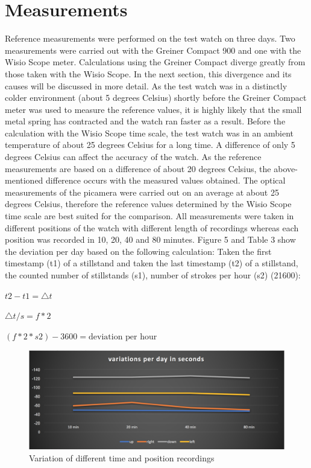 \documentclass[12pt, a4paper]{report}
\begin{document}
    \section{Measurements}
    Reference measurements were performed on the test watch on three days. Two measurements were carried out with the Greiner Compact 900 and one with the Wisio Scope meter. Calculations using the Greiner Compact diverge greatly from those taken with the Wisio Scope. In the next section, this divergence and its causes will be discussed in more detail. 
\bigskip
\newline
As the test watch was in a distinctly colder environment (about 5 degrees Celsius) shortly before the Greiner Compact meter was used to measure the reference values, it is highly likely that the small metal spring has contracted and the watch ran faster as a result. Before the calculation with the Wisio Scope time scale, the test watch was in an ambient temperature of about 25 degrees Celsius for a long time. A difference of only 5 degrees Celsius can affect the accuracy of the watch. As the reference measurements are based on a difference of about 20 degrees Celsius, the above-mentioned difference occurs with the measured values obtained.
The optical measurements of the picamera were carried out on an average at about 25 degrees Celsius, therefore the reference values determined by the Wisio Scope time scale are best suited for the comparison.
\bigskip
\newline
    All measurements were taken in different positions of the watch with different length
    of recordings whereas each position was recorded in 10, 20, 40 and 80 minutes.
\bigskip
\newline
    Figure 5 and Table 3 show the deviation per day based on the following calculation:
    Taken the first timestamp (t1) of a stillstand and taken the last timestamp (t2) of a stillstand, the counted number of stillstands (s1), number of strokes per hour (s2) (21600):
    \bigskip
    
    \(t2-t1 = \triangle t\)
    
    \(\triangle t / s = f*2\)
    
    \((f*2*s2)-3600=\text{deviation per hour}\)
    
    \noindent
    \begin{figure}[H]
        \includegraphics[scale=0.5]{Images/variations_per_day.png}
    
    \caption{ Variation of different time and position recordings}
    \end{figure}    
    
\end{document}
